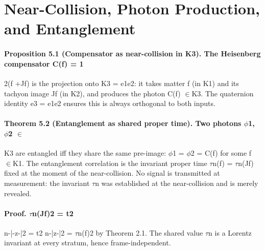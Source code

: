 \section{Near-Collision, Photon Production, and Entanglement}
\paragraph*{Proposition 5.1 (Compensator as near-collision in K3). The Heisenberg compensator C(f) = 1}
2(f +Jf) is the projection onto K3 = e1e2: it takes matter f (in K1) and its tachyon image Jf (in K2), and produces the photon C(f) $\in$K3. The quaternion identity e3 = e1e2 ensures this is always orthogonal to both inputs.
\paragraph*{Theorem 5.2 (Entanglement as shared proper time). Two photons $\phi$1, $\phi$2 $\in$}
K3 are entangled iff they share the same pre-image: $\phi$1 = $\phi$2 = C(f) for some f $\in$K1. The entanglement correlation is the invariant proper time $\tau$n(f) = $\tau$n(Jf) fixed at the moment of the near-collision. No signal is transmitted at measurement: the invariant $\tau$n was established at the near-collision and is merely revealed.
\paragraph*{Proof. $\tau$n(Jf)2 = t2}
n-|-z-|2 = t2 n-|z-|2 = $\tau$n(f)2 by Theorem 2.1. The shared value $\tau$n is a Lorentz invariant at every stratum, hence frame-independent.

